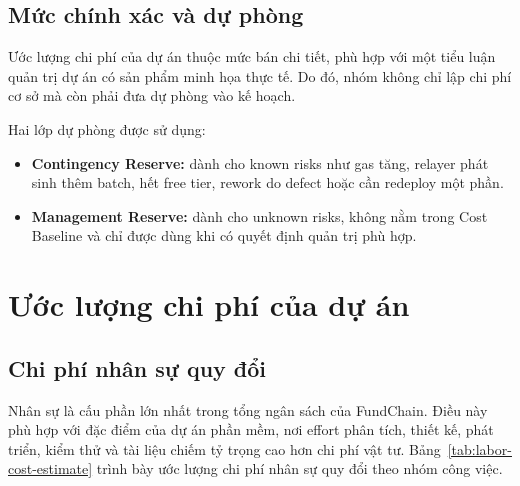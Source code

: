 \subsection{Mức chính xác và dự phòng}

Ước lượng chi phí của dự án thuộc mức bán chi tiết, phù hợp với một tiểu luận quản trị dự án có sản phẩm minh họa thực tế. Do đó, nhóm không chỉ lập chi phí cơ sở mà còn phải đưa dự phòng vào kế hoạch.

Hai lớp dự phòng được sử dụng:

\begin{itemize}
  \item \textbf{Contingency Reserve:} dành cho known risks như gas tăng, relayer phát sinh thêm batch, hết free tier, rework do defect hoặc cần redeploy một phần.
  \item \textbf{Management Reserve:} dành cho unknown risks, không nằm trong Cost Baseline và chỉ được dùng khi có quyết định quản trị phù hợp.
\end{itemize}


\fi
\section{Ước lượng chi phí của dự án}

\subsection{Chi phí nhân sự quy đổi}

Nhân sự là cấu phần lớn nhất trong tổng ngân sách của FundChain. Điều này phù hợp với đặc điểm của dự án phần mềm, nơi effort phân tích, thiết kế, phát triển, kiểm thử và tài liệu chiếm tỷ trọng cao hơn chi phí vật tư. Bảng~\ref{tab:labor-cost-estimate} trình bày ước lượng chi phí nhân sự quy đổi theo nhóm công việc.

